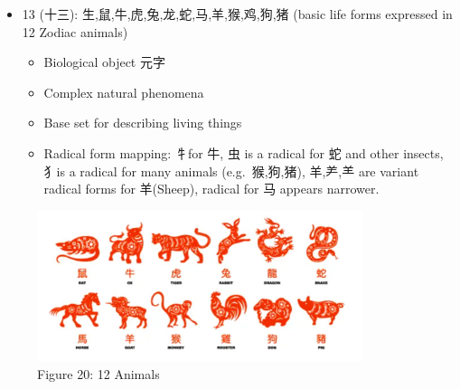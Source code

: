 \documentclass[
  11pt,
  letterpaper,
]{article}
\providecommand{\tightlist}{%
  \setlength{\itemsep}{0pt}\setlength{\parskip}{0pt}}
\begin{document}
\begin{itemize}
\tightlist
\item
  13 (十三): 生,鼠,牛,虎,兔,龙,蛇,马,羊,猴,鸡,狗,猪 (basic life forms
  expressed in 12 Zodiac animals)

  \begin{itemize}
  \tightlist
  \item
    Biological object 元字
  \item
    Complex natural phenomena
  \item
    Base set for describing living things
  \item
    Radical form mapping: 牜for 牛, 虫 is a radical for 蛇 and other
    insects, 犭is a radical for many animals (e.g.~猴,狗,猪), 羊,⺶,⺷
    are variant radical forms for 羊(Sheep), radical for 马 appears
    narrower.
  \end{itemize}
\end{itemize}

\begin{figure}
\centering
\includegraphics[width=0.85\textwidth]{./images/12-zodiac-animals.png}
\caption{Figure 20: 12 Animals}
\end{figure}
\end{document}
